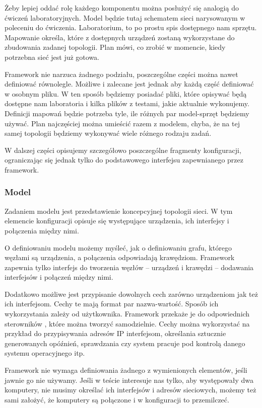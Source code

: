 \documentclass[00-praca-magisterska.tex]{subfiles}
\begin{document}
Żeby lepiej oddać rolę każdego komponentu można posłużyć się analogią do
ćwiczeń laboratoryjnych. Model będzie tutaj schematem sieci narysowanym w
poleceniu do ćwiczenia. Laboratorium, to po prostu spis dostępnego nam
sprzętu. Mapowanie określa, które z dostępnych urządzeń zostaną wykorzystane
do zbudowania zadanej topologii. Plan mówi, co zrobić w momencie, kiedy
potrzebna sieć jest już gotowa.

Framework nie narzuca żadnego podziału, poszczególne części można nawet
definiować równolegle. Możliwe i zalecane jest jednak aby każdą część
definiować w osobnym pliku. W ten sposób będziemy posiadać pliki,
które opisywać będą dostępne nam laboratoria i kilka plików z testami, jakie
aktualnie wykonujemy. Definicji mapowań będzie potrzeba tyle, ile różnych par
model-sprzęt będziemy używać. Plan najczęściej można umieścić razem z modelem,
chyba, że na tej samej topologii będziemy wykonywać wiele różnego rodzaju
zadań.

W dalszej części opisujemy szczegółowo poszczególne fragmenty konfiguracji,
ograniczając się jednak tylko do podstawowego interfejsu zapewnianego przez
framework. 

\subsubsection{Model}

Zadaniem modelu jest przedstawienie koncepcyjnej topologii sieci. W tym
elemencie konfiguracji opisuje się występujące urządzenia, ich interfejsy i
połączenia między nimi.

O definiowaniu modelu możemy myśleć, jak o definiowaniu grafu, którego węzłami
są urządzenia, a połączenia odpowiadają krawędziom. Framework zapewnia tylko
interfejs do tworzenia węzłów -- urządzeń i krawędzi -- dodawania interfejsów
i połączeń między nimi.

Dodatkowo możliwe jest przypisanie dowolnych cech zarówno urządzeniom jak też
ich interfejsom. Cechy te mają format par nazwa-wartość. Sposób ich
wykorzystania zależy od użytkownika. Framework przekaże je do odpowiednich
sterowników , które można
tworzyć samodzielnie. Cechy można wykorzystać na przykład do przypisywania
adresów IP interfejsom, określania sztucznie generowanych opóźnień,
sprawdzania czy system pracuje pod kontrolą danego systemu operacyjnego itp.

Framework nie wymaga definiowania żadnego z wymienionych elementów, jeśli
jawnie go nie używamy. Jeśli w teście interesuje nas tylko, aby występowały
dwa komputery, nie musimy określać ich interfejsów i adresów sieciowych,
możemy też sami założyć, że komputery są połączone i w konfiguracji to
przemilczeć.
\end{document}
